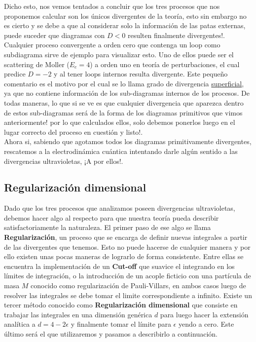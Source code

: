 \documentclass{article}
\numberwithin{equation}{section}
\begin{document}
Dicho esto, nos vemos tentados a concluir que los tres procesos que nos proponemos calcular son los únicos divergentes de la teoría, esto sin embargo no es cierto y se debe a que al considerar solo la información de las patas externas, puede suceder que diagramas con $ D<0 $ resulten finalmente divergentes!. Cualquier proceso convergente a orden cero que contenga un loop como subdiagrama sirve de ejemplo para visualizar esto. Uno de ellos puede ser el scattering de Moller ($ E_e=4 $) a orden uno en teoría de perturbaciones, el cual predice $ D=-2 $ y al tener loops internos resulta divergente. Este pequeño comentario es el motivo por el cual se lo llama grado de divergencia \underline{superficial}, ya que no contiene información de los sub-diagramas internos de los procesos. De todas maneras, lo que si se ve es que cualquier divergencia que aparezca dentro de estos sub-diagramas será de la forma de los diagramas primitivos que vimos anteriormente! por lo que calculados ellos, solo debemos ponerlos luego en el lugar correcto del proceso en cuestión y listo!.\\

Ahora si, sabiendo que agotamos todos los diagramas primitivamente divergentes, rescatemos a la electrodinámica cuántica intentando darle algún sentido a las divergencias ultravioletas, ¡A por ellos!.

\subsection{Regularización dimensional}

Dado que los tres procesos que analizamos poseen divergencias ultravioletas, debemos hacer algo al respecto para que nuestra teoría pueda describir satisfactoriamente la naturaleza. El primer paso de ese algo se llama \textbf{Regularización}, un proceso que se encarga de definir nuevas integrales a partir de las divergentes que tenemos. Esto no puede hacerse de cualquier manera y por ello existen unas pocas maneras de lograrlo de forma consistente. Entre ellas se encuentra la implementación de un \textbf{Cut-off} que suavice el integrando en los límites de integración, o la introducción de un acople ficticio con una partícula de masa $ M $ conocido como regularización de Pauli-Villars, en ambos casos luego de resolver las integrales se debe tomar el limite correspondiente a infinito. Existe un tercer método conocido como \textbf{Regularización dimensional} que consiste en trabajar las integrales en una dimensión genérica $ d $ para luego hacer la extensión analítica a $ d=4-2\epsilon $ y finalmente tomar el límite para $ \epsilon $ yendo a cero. Este último será el que utilizaremos y pasamos a describirlo a continuación.\\
\end{document}
